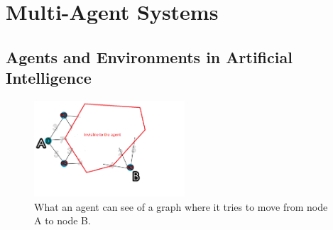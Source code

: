 
\section{Multi-Agent Systems}


\subsection{Agents and Environments in Artificial Intelligence}

\begin{figure}
\begin{centering}
\includegraphics[width=0.5\textwidth]{MASNodeSearch}
\par\end{centering}

\caption{What an agent can see of a graph where it tries to move from node
A to node B.\label{fig:MASNodeSearch}}


\end{figure}



